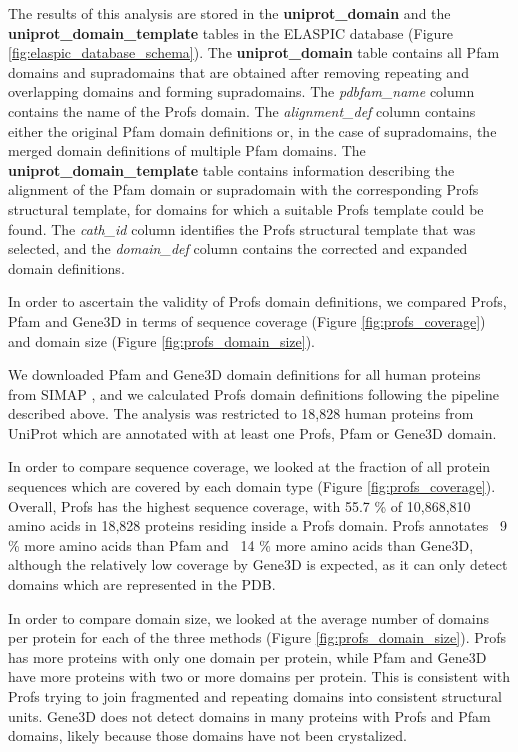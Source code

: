 The results of this analysis are stored in the \textbf{uniprot\_domain} and the \textbf{uniprot\_domain\_template} tables in the ELASPIC database (Figure \ref{fig:elaspic_database_schema}). The \textbf{uniprot\_domain} table contains all Pfam domains and supradomains that are obtained after removing repeating and overlapping domains and forming supradomains. The \textit{pdbfam\_name} column contains the name of the Profs domain. The \textit{alignment\_def} column contains either the original Pfam domain definitions or, in the case of supradomains, the merged domain definitions of multiple Pfam domains. The \textbf{uniprot\_domain\_template} table contains information describing the alignment of the Pfam domain or supradomain with the corresponding Profs structural template, for domains for which a suitable Profs template could be found. The \textit{cath\_id} column identifies the Profs structural template that was selected, and the \textit{domain\_def} column contains the corrected and expanded domain definitions.

In order to ascertain the validity of Profs domain definitions, we compared Profs, Pfam and Gene3D in terms of sequence coverage (Figure \ref{fig:profs_coverage}) and domain size (Figure \ref{fig:profs_domain_size}).

We downloaded Pfam and Gene3D domain definitions for all human proteins from SIMAP \cite{rattei_simapcomprehensive_2010}, and we calculated Profs domain definitions following the pipeline described above. The analysis was restricted to 18,828 human proteins from UniProt which are annotated with at least one Profs, Pfam or Gene3D domain.

In order to compare sequence coverage, we looked at the fraction of all protein sequences which are covered by each domain type (Figure \ref{fig:profs_coverage}). Overall, Profs has the highest sequence coverage, with 55.7 \% of 10,868,810 amino acids in 18,828 proteins residing inside a Profs domain. Profs annotates ~9 \% more amino acids than Pfam and ~14 \% more amino acids than Gene3D, although the relatively low coverage by Gene3D is expected, as it can only detect domains which are represented in the PDB.

In order to compare domain size, we looked at the average number of domains per protein for each of the three methods (Figure \ref{fig:profs_domain_size}). Profs has more proteins with only one domain per protein, while Pfam and Gene3D have more proteins with two or more domains per protein. This is consistent with Profs trying to join fragmented and repeating domains into consistent structural units. Gene3D does not detect domains in many proteins with Profs and Pfam domains, likely because those domains have not been crystalized.

